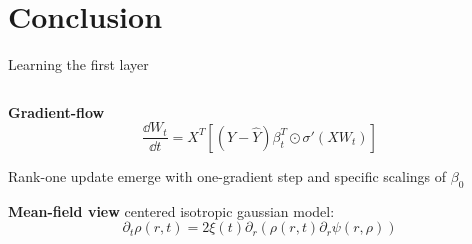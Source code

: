 \documentclass[10pt]{beamer}
\begin{document}
\section{Conclusion}

\begin{frame}{Learning the first layer}
  \begin{columns}[T]
    \begin{column}{0.5\textwidth}
        \begin{block}{}
          \textbf{Gradient-flow} \cite{NEURIPS2022_f7e7fabd}
          \begin{equation*}
            \frac{\dd W_t}{\dd t} = X^T \left[ (
                Y - \hat Y
              ) \beta_t^T  \odot \sigma'(XW_t)
            \right]
          \end{equation*}

          Rank-one update emerge with one-gradient step and specific scalings of $\beta_0$
        \end{block}

        \begin{block}{}
          \textbf{Mean-field view} \cite{mei2018mean}
          centered isotropic gaussian model:
          \begin{equation*}
            \partial_t \rho(r,t) =
            2\xi(t) \partial_r ( \rho(r,t) \partial_r \psi(r, \rho))
          \end{equation*}


\end{block}
\end{column}
\end{columns}
\end{frame}
\end{document}
